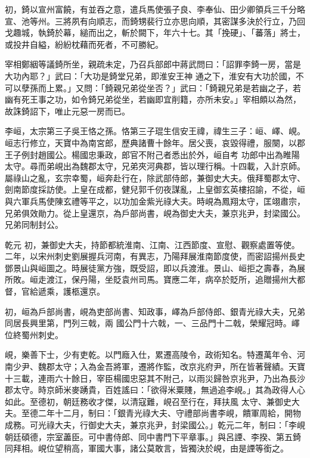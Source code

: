 \begin{pinyinscope}
 初，錡以宣州富饒，有並吞之意，遣兵馬使張子良、李奉仙、田少卿領兵三千分略宣、池等州。三將夙有向順志，而錡甥裴行立亦思向順，其密謀多決於行立，乃回戈趣城，執錡於幕，縋而出之，斬於闕下，年六十七。其「挽硬」、「蕃落」將士，或投井自縊，紛紛枕藉而死者，不可勝紀。



 宰相鄭絪等議錡所坐，親疏未定，乃召兵部郎中蔣武問曰：「詔罪李錡一房，當是大功內耶？」武曰：「大功是錡堂兄弟，即淮安王神
 通之下，淮安有大功於國，不可以孽孫而上累。」又問：「錡親兄弟從坐否？」武曰：「錡親兄弟是若幽之子，若幽有死王事之功，如令錡兄弟從坐，若幽即宜削籍，亦所未安。」宰相頗以為然，故誅錡詔下，唯止元惡一房而已。



 李峘，太宗第三子吳王恪之孫。恪第三子琨生信安王禕，禕生三子：峘、嶧、峴。峘志行修立，天寶中為南宮郎，歷典諸曹十餘年。居父喪，哀毀得禮，服闋，以郡王子例封趙國公。楊國忠秉政，郎官不附己者悉出於外，峘自考
 功郎中出為睢陽太守。尋而弟峴出為魏郡太守，兄弟夾河典郡，皆以理行稱。十四載，入計京師。屬祿山之亂，玄宗幸蜀，峘奔赴行在，除武部侍郎，兼御史大夫。俄拜蜀郡太守、劍南節度採訪使。上皇在成都，健兒郭千仞夜謀亂，上皇御玄英樓招諭，不從，峘與六軍兵馬使陳玄禮等平之，以功加金紫光祿大夫。時峴為鳳翔太守，匡翊肅宗，兄弟俱效勛力。從上皇還京，為戶部尚書，峴為御史大夫，兼京兆尹，封梁國公。兄弟同制封公。



 乾元
 初，兼御史大夫，持節都統淮南、江南、江西節度、宣慰、觀察處置等使。二年，以宋州刺史劉展握兵河南，有異志，乃陽拜展淮南節度使，而密詔揚州長史鄧景山與峘圖之。時展徒黨方強，既受詔，即以兵渡淮。景山、峘拒之壽春，為展所敗。峘走渡江，保丹陽，坐貶袁州司馬。寶應二年，病卒於貶所，追贈揚州大都督，官給遞乘，護柩還京。



 初，峘為戶部尚書，峴為吏部尚書、知政事，嶧為戶部侍郎、銀青光祿大夫，兄弟同居長興里第，門列三戟，兩
 國公門十六戟，一、三品門十二戟，榮耀冠時。嶧位終蜀州刺史。



 峴，樂善下士，少有吏乾。以門廕入仕，累遷高陵令，政術知名。特遷萬年令、河南少尹、魏郡太守；入為金吾將軍，遷將作監，改京兆府尹，所在皆著聲績。天寶十三載，連雨六十餘日，宰臣楊國忠惡其不附己，以雨災歸咎京兆尹，乃出為長沙郡太守。時京師米麥踴貴，百姓謠曰：「欲得米粟賤，無過追李峴。」其為政得人心如此。至德初，朝廷務收才傑，以清寇難，峴召至行在，拜扶風
 太守、兼御史大夫。至德二年十二月，制曰：「銀青光祿大夫、守禮部尚書李峴，饋軍周給，開物成務。可光祿大夫，行御史大夫，兼京兆尹，封梁國公。」乾元二年，制曰：「李峴朝廷碩德，宗室藎臣。可中書侍郎、同中書門下平章事。」與呂諲、李揆、第五錡同拜相。峴位望稍高，軍國大事，諸公莫敢言，皆獨決於峴，由是諲等銜之。




\end{pinyinscope}
